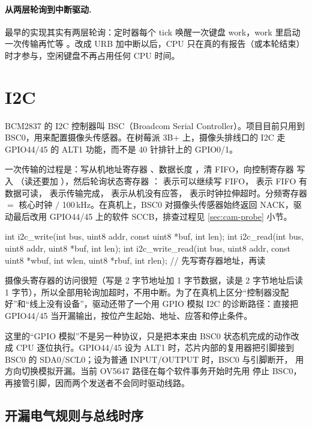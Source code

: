 \paragraph{从两层轮询到中断驱动.} 最早的实现其实有两层轮询：定时器每个 tick 唤醒一次键盘 work，work 里启动一次传输再忙等 。改成 URB 加中断以后，CPU 只在真的有报告（或本轮结束）时才参与，空闲键盘不再占用任何 CPU 时间。

\section{I2C}

BCM2837 的 I2C 控制器叫 BSC（Broadcom Serial Controller）。项目目前只用到 BSC0，用来配置摄像头传感器。在树莓派 3B+ 上，摄像头排线口的 I2C 走 GPIO44/45 的 ALT1 功能，而不是 40 针排针上的 GPIO0/1。

一次传输的过程是：写从机地址寄存器 、数据长度 ，清 FIFO，向控制寄存器  写入 （读还要加 ），然后轮询状态寄存器 ： 表示可以继续写 FIFO， 表示 FIFO 有数据可读， 表示传输完成， 表示从机没有应答， 表示时钟拉伸超时。分频寄存器  $=$ 核心时钟 $/$ 100\,kHz。在真机上，BSC0 对摄像头传感器始终返回 NACK，驱动最后改用 GPIO44/45 上的软件 SCCB，排查过程见 \ref{sec:cam-probe} 小节。

\begin{ccode}
int i2c_write(int bus, uint8 addr, const uint8 *buf, int len);
int i2c_read(int bus, uint8 addr, uint8 *buf, int len);
int i2c_write_read(int bus, uint8 addr, const uint8 *wbuf, int wlen,
                   uint8 *rbuf, int rlen);     // 先写寄存器地址，再读
\end{ccode}

摄像头寄存器的访问很短（写是 2 字节地址加 1 字节数据，读是 2 字节地址后读 1 字节），所以全部用轮询加超时，不用中断。为了在真机上区分“控制器没配好”和“线上没有设备”，驱动还带了一个用 GPIO 模拟 I2C 的诊断路径：直接把 GPIO44/45 当开漏输出，按位产生起始、地址、应答和停止条件。

这里的“GPIO 模拟”不是另一种协议，只是把本来由 BSC0 状态机完成的动作改成 CPU 逐位执行。GPIO44/45 设为 ALT1 时，芯片内部的复用器把引脚接到 BSC0 的 SDA0/SCL0；设为普通 INPUT/OUTPUT 时，BSC0 与引脚断开， 用方向切换模拟开漏。当前 OV5647 路径在每个软件事务开始时先用  停止 BSC0，再接管引脚，因而两个发送者不会同时驱动线路。

\subsection{开漏电气规则与总线时序}


